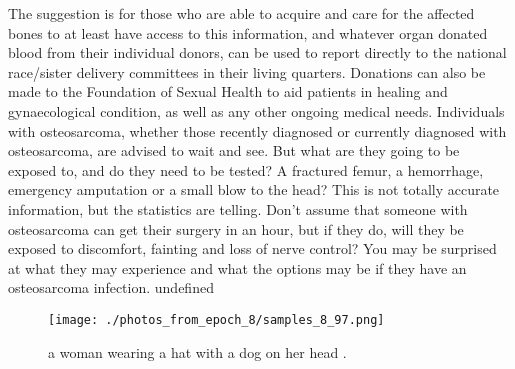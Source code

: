 \documentclass{article}%
\begin{document}
The suggestion is for those who are able to acquire and care for the affected bones to at least have access to this information, and whatever organ donated blood from their individual donors, can be used to report directly to the national\newline%
race/sister delivery committees in their living quarters. Donations can also be made to the Foundation of Sexual Health to aid patients in healing and gynaecological condition, as well as any other ongoing medical needs.\newline%
Individuals with osteosarcoma, whether those recently diagnosed or currently diagnosed with osteosarcoma, are advised to wait and see. But what are they going to be exposed to, and do they need to be tested?\newline%
A fractured femur, a hemorrhage, emergency amputation or a small blow to the head? This is not totally accurate information, but the statistics are telling. Don't assume that someone with osteosarcoma can get their surgery in an hour, but if they do, will they be exposed to discomfort, fainting and loss of nerve control?\newline%
You may be surprised at what they may experience and what the options may be if they have an osteosarcoma infection.\newline%
undefined\newline%

%


\begin{figure}[h!]%
\centering%
\texttt{[image: ./photos\_from\_epoch\_8/samples\_8\_97.png]}%
\caption{a woman wearing a hat with a dog on her head .}%
\end{figure}

%
\end{document}
